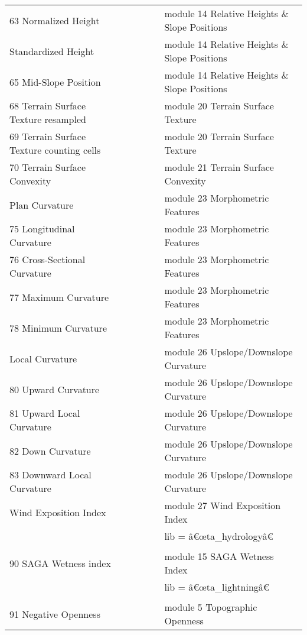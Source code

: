 \documentclass[
]{article}
\begin{document}
\begin{longtable}[t]{llllll}
63 Normalized Height &  &  &  &  & module 14 Relative Heights \& Slope Positions\\
\addlinespace
64 Standardized Height &  &  &  &  & module 14 Relative Heights \& Slope Positions\\
65 Mid-Slope Position &  &  &  &  & module 14 Relative Heights \& Slope Positions\\
68 Terrain Surface Texture       
       resampled &  &  &  &  & module 20 Terrain Surface Texture\\
69 Terrain Surface Texture 
      counting cells &  &  &  &  & module 20 Terrain Surface Texture\\
70 Terrain Surface Convexity &  &  &  &  & module 21 Terrain Surface Convexity\\
\addlinespace
74 Plan Curvature &  &  &  &  & module 23 Morphometric Features\\
75 Longitudinal Curvature &  &  &  &  & module 23 Morphometric Features\\
76 Cross-Sectional Curvature &  &  &  &  & module 23 Morphometric Features\\
77 Maximum Curvature &  &  &  &  & module 23 Morphometric Features\\
78 Minimum Curvature &  &  &  &  & module 23 Morphometric Features\\
\addlinespace
79 Local Curvature &  &  &  &  & module 26 Upslope/Downslope Curvature\\
80 Upward Curvature &  &  &  &  & module 26 Upslope/Downslope Curvature\\
81 Upward Local Curvature &  &  &  &  & module 26 Upslope/Downslope Curvature\\
82 Down Curvature &  &  &  &  & module 26 Upslope/Downslope Curvature\\
83 Downward Local Curvature &  &  &  &  & module 26 Upslope/Downslope Curvature\\
\addlinespace
84 Wind Exposition Index &  &  &  &  & module 27 Wind Exposition Index\\
 &  &  &  &  & lib = â€œta\_hydrologyâ€\\
90 SAGA Wetness index &  &  &  &  & module 15 SAGA Wetness Index\\
 &  &  &  &  & lib = â€œta\_lightningâ€\\
91 Negative Openness &  &  &  &  & module 5 Topographic Openness\\
\bottomrule
\end{longtable}

\newpage
\end{document}
